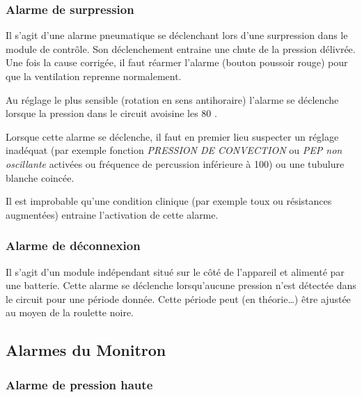 \subsubsection{Alarme de surpression}
Il s'agit d'une alarme pneumatique se déclenchant lors d'une surpression
dans le module de contrôle. Son déclenchement entraine une chute de la
pression délivrée. Une fois la cause corrigée, il faut réarmer l'alarme
(bouton poussoir rouge) pour que la ventilation reprenne normalement.

Au réglage le plus sensible (rotation en sens antihoraire) l'alarme se
déclenche lorsque la pression dans le circuit avoisine les 80 \cmh.

Lorsque cette alarme se déclenche, il faut en premier lieu suspecter un
réglage inadéquat (par exemple fonction \emph{PRESSION DE CONVECTION} ou
\emph{PEP non oscillante} activées ou fréquence de percussion inférieure
à 100) ou une tubulure blanche coincée.

Il est improbable qu'une condition clinique (par exemple toux ou
résistances augmentées) entraine l'activation de cette alarme.

\subsubsection{Alarme de déconnexion}

Il s'agit d'un module indépendant situé sur le côté de l'appareil et
alimenté par une batterie. Cette alarme se déclenche lorsqu'aucune
pression n'est détectée dans le circuit pour une période donnée. Cette
période peut (en théorie\ldots{}) être ajustée au moyen de la roulette
noire.

\subsection{Alarmes du Monitron}

\subsubsection*{Alarme de pression haute}%

